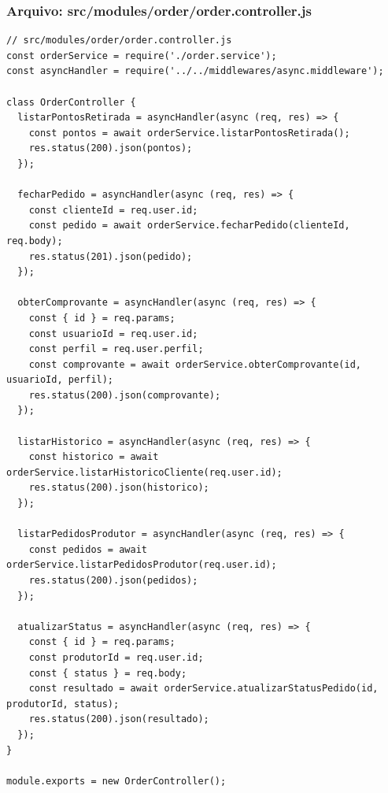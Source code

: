 \subsubsection*{Arquivo: src/modules/order/order.controller.js}
\begin{lstlisting}[caption={src/modules/order/order.controller.js}]
// src/modules/order/order.controller.js
const orderService = require('./order.service');
const asyncHandler = require('../../middlewares/async.middleware');

class OrderController {
  listarPontosRetirada = asyncHandler(async (req, res) => {
    const pontos = await orderService.listarPontosRetirada();
    res.status(200).json(pontos);
  });

  fecharPedido = asyncHandler(async (req, res) => {
    const clienteId = req.user.id;
    const pedido = await orderService.fecharPedido(clienteId, req.body);
    res.status(201).json(pedido);
  });

  obterComprovante = asyncHandler(async (req, res) => {
    const { id } = req.params;
    const usuarioId = req.user.id;
    const perfil = req.user.perfil;
    const comprovante = await orderService.obterComprovante(id, usuarioId, perfil);
    res.status(200).json(comprovante);
  });

  listarHistorico = asyncHandler(async (req, res) => {
    const historico = await orderService.listarHistoricoCliente(req.user.id);
    res.status(200).json(historico);
  });

  listarPedidosProdutor = asyncHandler(async (req, res) => {
    const pedidos = await orderService.listarPedidosProdutor(req.user.id);
    res.status(200).json(pedidos);
  });

  atualizarStatus = asyncHandler(async (req, res) => {
    const { id } = req.params;
    const produtorId = req.user.id;
    const { status } = req.body;
    const resultado = await orderService.atualizarStatusPedido(id, produtorId, status);
    res.status(200).json(resultado);
  });
}

module.exports = new OrderController();\end{lstlisting}
\vspace{0.5cm}
